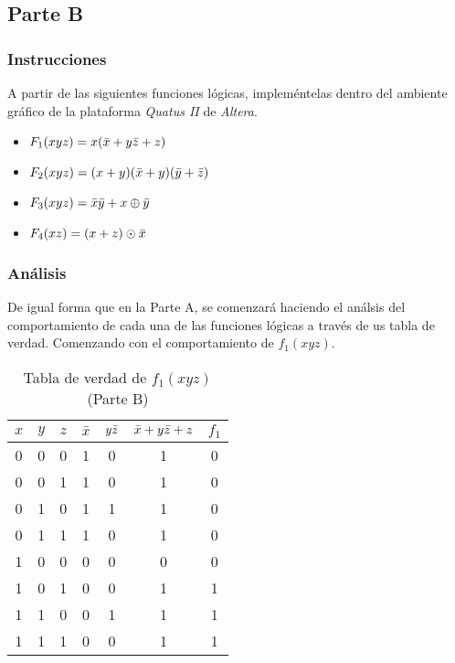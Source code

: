 \documentclass[../procedimientos.tex]{subfiles}
\begin{document}
\clearpage
\subsection{Parte B}
\subsubsection{Instrucciones}
A partir de las siguientes funciones lógicas, impleméntelas dentro del 
ambiente gráfico de la plataforma \textit{Quatus II} de \textit{Altera}.
\begin{itemize}
  \item $F_1 (xyz) = x (\bar{x} + y\bar{z} + z)$
  \item $F_2 (xyz) = (x + y) (\bar{x} + y) (\bar{y} + \bar{z})$
  \item $F_3 (xyz) = \bar{x}\bar{y} + x\oplus\bar{y}$
  \item $F_4 (xz)  = (x + z)\odot\bar{x}$
\end{itemize}

\subsubsection{Análisis}
De igual forma que en la Parte A, se comenzará haciendo el análsis del 
comportamiento de cada una de las funciones lógicas a través de us tabla de 
verdad. Comenzando con el comportamiento de $f_1(xyz)$.
\begin{table}[H]
  \centering
  \begin{tabular}{ccc|ccc|c}
    \hline
    $x$ & $y$ & $z$ & $\bar{x}$ & $y\bar{z}$ & $\bar{x}+y\bar{z}+z$ & $f_1$\\
    \hline
    0 & 0 & 0 & 1 & 0 & 1 & 0\\
    0 & 0 & 1 & 1 & 0 & 1 & 0\\
    0 & 1 & 0 & 1 & 1 & 1 & 0\\
    0 & 1 & 1 & 1 & 0 & 1 & 0\\
    1 & 0 & 0 & 0 & 0 & 0 & 0\\
    1 & 0 & 1 & 0 & 0 & 1 & 1\\
    1 & 1 & 0 & 0 & 1 & 1 & 1\\
    1 & 1 & 1 & 0 & 0 & 1 & 1\\
    \hline
  \end{tabular}
  \caption{Tabla de verdad de $f_1(xyz)$ (Parte B)}
  \label{tab:b_f1}
\end{table}
\end{document}
